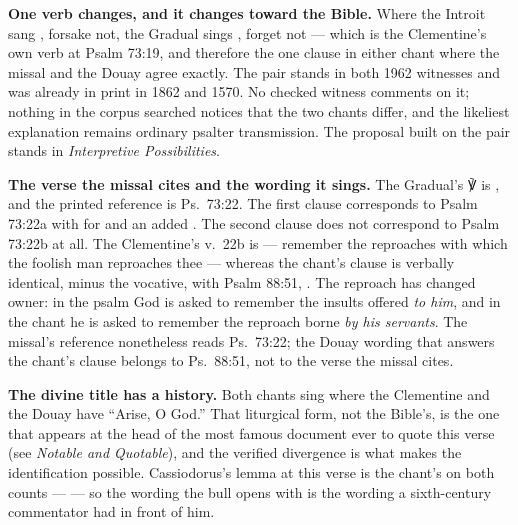 \textbf{One verb changes, and it changes toward the Bible.} Where the Introit
sang , forsake not, the Gradual sings , forget not --- which is the Clementine's own verb at Psalm
73:19, and therefore the one clause in either chant where the missal and the
Douay agree exactly. The pair stands in both 1962 witnesses and was already in
print in 1862 and 1570. No checked witness comments on it; nothing in the
corpus searched notices that the two chants differ, and the likeliest
explanation remains ordinary psalter transmission. The proposal built on the
pair stands in \textit{Interpretive Possibilities}.

\textbf{The verse the missal cites and the wording it sings.} The Gradual's
℣ is , and the printed reference is Ps.\ 73:22. The first clause
corresponds to Psalm 73:22a with  for  and an added
. The second clause does not correspond to Psalm 73:22b at all. The
Clementine's v.~22b is  --- remember the reproaches with which the foolish
man reproaches thee --- whereas the chant's clause is verbally identical,
minus the vocative, with Psalm 88:51, . The reproach has changed owner: in the psalm God is asked to
remember the insults offered \textit{to him}, and in the chant he is asked to
remember the reproach borne \textit{by his servants}. The missal's reference
nonetheless reads Ps.~73:22; the Douay wording that answers the chant's clause
belongs to Ps.~88:51, not to the verse the missal cites.

\textbf{The divine title has a history.} Both chants sing
 where the Clementine and the Douay have ``Arise, O
God.'' That liturgical form, not the Bible's, is the one that appears at the
head of the most famous document ever to quote this verse (see
\textit{Notable and Quotable}), and the verified divergence is what makes the
identification possible.
Cassiodorus's lemma at this verse is the chant's on both counts ---
 --- so the wording the bull opens
with is the wording a sixth-century commentator had in front of him.


